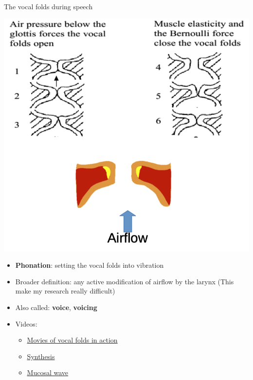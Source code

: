 \documentclass[professionalfonts]{beamer}
\begin{document}
\begin{frame}{The vocal folds during speech}
    \begin{multicols}{2}
        \includegraphics[width = \linewidth]{figs/Phonation.png}

        \columnbreak

        \begin{itemize}
        \item \textbf{Phonation}: setting the vocal folds into vibration
        \item Broader definition: any active modification of airflow by the larynx (This make my research really difficult)
        \item Also called: \textbf{voice}, \textbf{voicing}
        \item Videos:
        \begin{itemize}
            \item \href{https://voice.weill.cornell.edu/voice-evaluation/normal-voice-function}{Movies of vocal folds in action}
            \item \href{https://youtu.be/wR41CRbIjV4?feature=shared}{Synthesis}
            \item \href{https://youtu.be/UsFtDdd3emE?feature=shared&t=12}{Mucosal wave}
        \end{itemize}
    \end{itemize}
    \end{multicols}
\end{frame}
\end{document}
